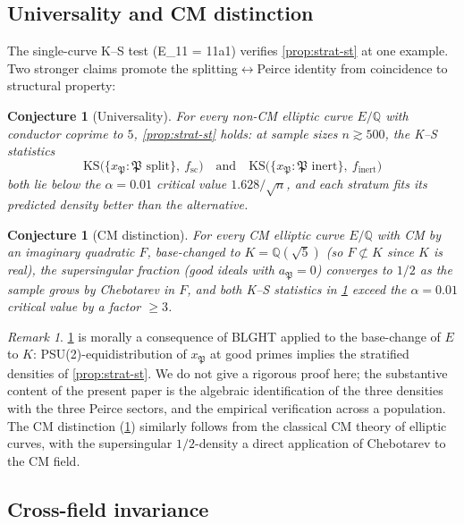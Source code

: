 \documentclass[11pt,a4paper]{article}
\theoremstyle{plain}
\newtheorem{conjecture}[theorem]{Conjecture}
\theoremstyle{definition}
\theoremstyle{remark}
\newtheorem{remark}[theorem]{Remark}
\numberwithin{equation}{section}
\providecommand{\Q}{\mathbb{Q}}
\begin{document}
\subsection{Universality and CM distinction}
\label{ssec:universality}

The single-curve K--S test (E\_{11} = 11a1) verifies
\cref{prop:strat-st} at one example. Two stronger claims promote
the splitting$\leftrightarrow$Peirce identity from coincidence to
structural property:

\begin{conjecture}[Universality]
\label{conj:universality}
For every non-CM elliptic curve $E/\Q$ with conductor coprime to $5$,
\cref{prop:strat-st} holds: at sample sizes $n \gtrsim 500$, the
K--S statistics
\[
\mathrm{KS}\bigl(\{x_\mathfrak{P} : \mathfrak P \text{ split}\},\ f_{\mathrm{sc}}\bigr)
\quad\text{and}\quad
\mathrm{KS}\bigl(\{x_\mathfrak{P} : \mathfrak P \text{ inert}\},\ f_{\mathrm{inert}}\bigr)
\]
both lie below the $\alpha = 0.01$ critical value $1.628/\sqrt{n}$,
and each stratum fits its predicted density better than the
alternative.
\end{conjecture}

\begin{conjecture}[CM distinction]
\label{conj:cm}
For every CM elliptic curve $E/\Q$ with CM by an imaginary
quadratic $F$, base-changed to $K = \Q(\sqrt 5)$
(so $F \not\subset K$ since $K$ is real),
the supersingular fraction (good ideals with $a_\mathfrak{P} = 0$)
converges to $1/2$ as the sample grows by Chebotarev in $F$, and
both K--S statistics in \cref{conj:universality} exceed the
$\alpha = 0.01$ critical value by a factor $\geq 3$.
\end{conjecture}

\begin{remark}
\cref{conj:universality} is morally a consequence of BLGHT
applied to the base-change of $E$ to $K$: PSU(2)-equidistribution
of $x_\mathfrak{P}$ at good primes implies the stratified densities
of \cref{prop:strat-st}. We do not give a rigorous proof here;
the substantive content of the present paper is the algebraic
identification of the three densities with the three Peirce
sectors, and the empirical verification across a population. The
CM distinction (\cref{conj:cm}) similarly follows from the
classical CM theory of elliptic curves, with the supersingular
$1/2$-density a direct application of Chebotarev to the CM field.
\end{remark}

\subsection{Cross-field invariance}
\label{ssec:cross-field}
\end{document}
